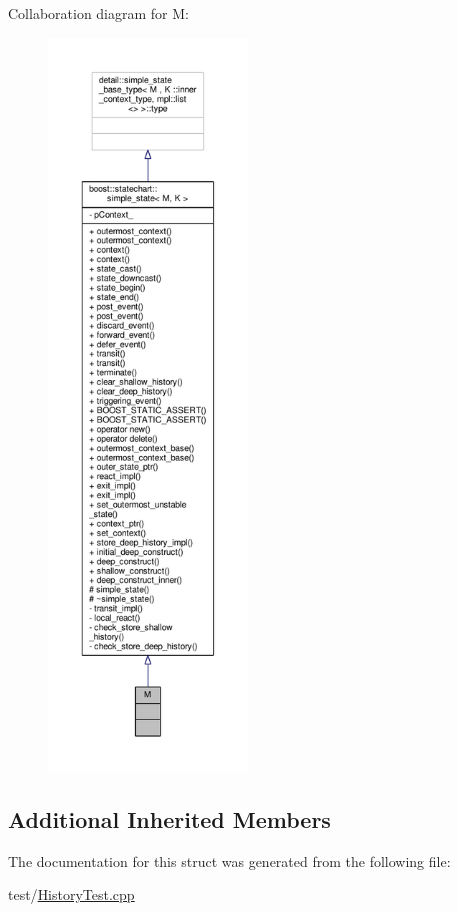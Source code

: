 Collaboration diagram for M\+:
\nopagebreak
\begin{figure}[H]
\begin{center}
\leavevmode
\includegraphics[height=550pt]{struct_m__coll__graph}
\end{center}
\end{figure}
\subsection*{Additional Inherited Members}


The documentation for this struct was generated from the following file\+:\begin{DoxyCompactItemize}
\item 
test/\mbox{\hyperlink{_history_test_8cpp}{History\+Test.\+cpp}}\end{DoxyCompactItemize}
